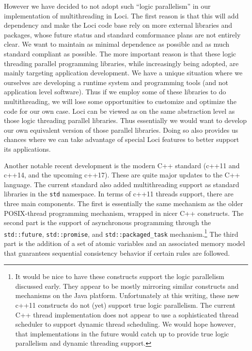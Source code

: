 \documentclass{article}
\begin{document}
However we have decided to not adopt such ``logic parallelism'' in our
implementation of multithreading in Loci.  The first reason is that this
will add dependency and make the Loci code base rely on more external
libraries and packages, whose future status and standard comformance
plans are not entirely clear.  We want to maintain as minimal dependence
as possible and as much standard compliant as possible.  The more
important reason is that these logic threading parallel programming
libraries, while increasingly being adopted, are mainly targeting
application development.  We have a unique situation where we ourselves
are developing a runtime system and programming tools (and not
application level software).  Thus if we employ some of these libraries
to do multithreading, we will lose some opportunities to customize and
optimize the code for our own case.  Loci can be viewed as on the same
abstraction level as those logic threading parallel libraries.  Thus
essentially we would want to develop our own equivalent version of those
parallel libraries.  Doing so also provides us chances where we can take
advantage of special Loci features to better support its applications.

Another notable recent development is the modern C++ standard (c++11 and
c++14, and the upcoming c++17).  These are quite major updates to the
C++ language.  The current standard also added multithreading support
as standard libraries in the \texttt{std} namespace.  In terms of c++11
threads support, there are three main components. The first is
essentially the same mechanism as the older POSIX-thread programming
mechanism, wrapped in nicer C++ constructs.
The second part is the support of
asynchronous programming through the \texttt{std::future},
\texttt{std::promise}, and \texttt{std::packaged\_task}
mechanism.\footnote{It would be nice to have these constructs support
  the logic parallelism discussed early.  They appear to be mostly
  mirroring similar constructs and mechanisms on the Java platform.
  Unfortunately at this writing, these new c++11 constructs do not (yet)
  support true logic parallelism.  The current C++ thread implementation
  does not appear to use a sophisticated thread scheduler to support
  dynamic thread scheduling.  We would hope however, that implementations
  in the future would catch up to provide true logic parallelism and 
  dynamic threading support.}  The third part is the addition of a set
of atomic variables and an associated memory model that guarantees
sequential consistency behavior if certain rules are followed.
\end{document}
